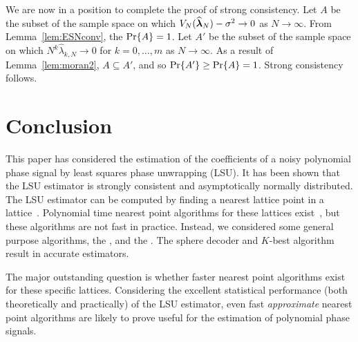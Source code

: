 \documentclass[journal]{IEEEtran}
\begin{document}
We are now in a position to complete the proof of strong consistency.  Let $A$ be the subset of the sample space on which  $V_N(\widehat{\boldsymbol{\lambda}}_N) - \sigma^2 \rightarrow 0$ as $N\rightarrow\infty$.  From Lemma~\ref{lem:ESNconv}, the $\operatorname{Pr}\{A\} =1$.  Let $A'$ be the subset of the sample space on which $N^k\widehat{\lambda}_{k,N} \rightarrow 0$ for $k=0,\dots,m$ as $N\rightarrow\infty$.  As a result of Lemma~\ref{lem:moran2}, $A \subseteq A'$, and so $\operatorname{Pr}\{A'\} \geq \operatorname{Pr}\{A\} = 1$.  Strong consistency follows.




 
\section{Conclusion} \label{sec:conclusion}
 
This paper has considered the estimation of the coefficients of a noisy polynomial phase signal by least squares phase unwrapping (LSU). It has been shown that the LSU estimator is strongly consistent and asymptotically normally distributed. %
The LSU estimator can be computed by finding a nearest lattice point in a lattice~\cite{McKilliam2009asilomar_polyest_lattice}.  %
Polynomial time nearest point algorithms for these lattices exist~\cite[Sec 4.3]{McKilliam2010thesis}, but these algorithms are not fast in practice.  Instead, we considered some general purpose algorithms, the ,  and the . The sphere decoder and $K$-best algorithm result in accurate estimators.

The major outstanding question is whether faster nearest point algorithms exist for these specific lattices.  Considering the excellent statistical performance (both theoretically and practically) of the LSU estimator, even fast \emph{approximate} nearest point algorithms are likely to prove useful for the estimation of polynomial phase signals. 
  
\end{document}
